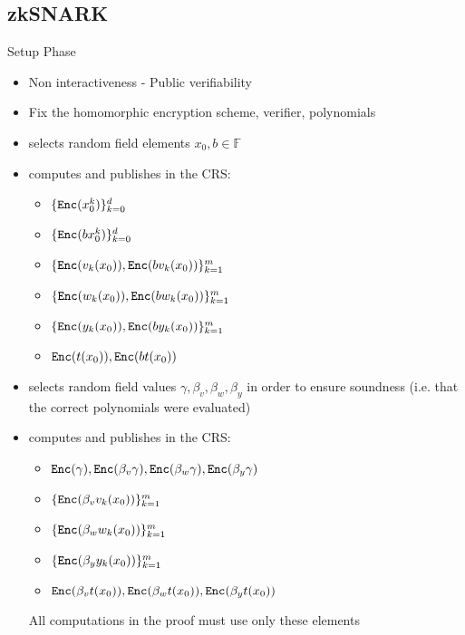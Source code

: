 \documentclass[handouts]{beamer}
\begin{document}
\subsection{zkSNARK}
\begin{frame}[allowframebreaks]{Setup Phase} 
    \begin{itemize}
        \item Non interactiveness - Public verifiability 
        \item Fix the homomorphic encryption scheme, verifier, polynomials  
        \item \ver selects random field elements $x_0,b \in \mathbb{F}$  
        \item computes and publishes in the CRS:
        \begin{itemize}
            \item $\{ \mathtt{Enc}(x_0^k) \}_{k=0}^d$  
            \item $\{ \mathtt{Enc}(bx_0^k)\}_{k=0}^d$  
            \item $\{ \mathtt{Enc}(v_k(x_0)),\mathtt{Enc}(bv_k(x_0)) \}_{k=1}^m$  
            \item $\{ \mathtt{Enc}(w_k(x_0)),\mathtt{Enc}(bw_k(x_0)) \}_{k=1}^m$  
            \item $\{ \mathtt{Enc}(y_k(x_0)),\mathtt{Enc}(by_k(x_0)) \}_{k=1}^m$  
            \item $\mathtt{Enc}(t(x_0)), \mathtt{Enc}(bt(x_0))$
        \end{itemize} 

        \framebreak

        \item selects random field values $\gamma, \beta_v, \beta_w, \beta_y$ in order to ensure soundness (i.e. that the correct polynomials were evaluated) \pause
        \item computes and publishes in the CRS: \pause
        \begin{itemize}
            \item $\mathtt{Enc}(\gamma), \mathtt{Enc}(\beta_v \gamma), \mathtt{Enc}(\beta_w \gamma), \mathtt{Enc}(\beta_y \gamma)$ \pause
            \item $\{ \mathtt{Enc}( \beta_v v_k(x_0))\}_{k=1}^m$ \pause
            \item $\{ \mathtt{Enc}(\beta_w w_k(x_0))\}_{k=1}^m$ \pause
            \item $\{ \mathtt{Enc}(\beta_y y_k(x_0))\}_{k=1}^m$ \pause
            \item $\mathtt{Enc}(\beta_v t(x_0)), \mathtt{Enc}(\beta_w t(x_0)), \mathtt{Enc}(\beta_y t(x_0))$ \pause
        \end{itemize} 

        All computations in the proof must use only these elements \pause
    \end{itemize}
\end{frame}
\end{document}
